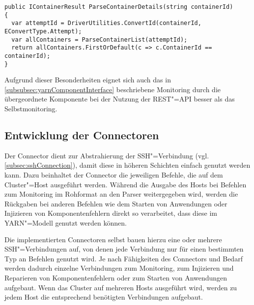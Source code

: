 \begin{lstlisting}[label=lst:restParseDetails,style=cs,
caption={[Konvertierung und Rückgabe der Daten eines einzelnen Containers durch den RestParser]
    Konvertierung und Rückgabe der Daten eines einzelnen Containers durch den \texttt{RestParser}.
    Hierbei muss zunächst die ID des übergeordneten Attempts ermittelt werden, bevor aus der Liste aller Container die Daten des gesuchten Containers zurückgegeben werden können.
    Bei Attempts ist dieses Vorgehen analog.}]
public IContainerResult ParseContainerDetails(string containerId)
{
  var attemptId = DriverUtilities.ConvertId(containerId, EConvertType.Attempt);
  var allContainers = ParseContainerList(attemptId);
  return allContainers.FirstOrDefault(c => c.ContainerId == containerId);
}
\end{lstlisting}

Aufgrund dieser Besonderheiten eignet sich auch das in \cref{subsubsec:yarnComponentInterface} beschriebene Monitoring durch die übergeordnete Komponente bei der Nutzung der REST"=API besser als das Selbstmonitoring.

\subsection{Entwicklung der Connectoren}
\label{subsec:implementedConnectors}

Der Connector dient zur Abstrahierung der SSH"=Verbindung (vgl. \cref{subsec:sshConnection}), damit diese in höheren Schichten einfach genutzt werden kann.
Dazu beinhaltet der Connector die jeweiligen Befehle, die auf dem Cluster"=Host ausgeführt werden.
Während die Ausgabe des Hosts bei Befehlen zum Monitoring im Rohformat an den Parser weitergegeben wird, werden die Rückgaben bei anderen Befehlen wie \zB dem Starten von Anwendungen oder Injizieren von Komponentenfehlern direkt so verarbeitet, dass diese im \ac{YARN}"=Modell genutzt werden können.

Die implementierten Connectoren selbst bauen hierzu eine oder mehrere SSH"=Verbindungen auf, von denen jede Verbindung nur für einen bestimmten Typ an Befehlen genutzt wird.
Je nach Fähigkeiten des Connectors und Bedarf werden dadurch einzelne Verbindungen zum Monitoring, zum Injizieren und Reparieren von Komponentenfehlern oder zum Starten von Anwendungen aufgebaut.
Wenn das Cluster auf mehreren Hosts ausgeführt wird, werden zu jedem Host die entsprechend benötigten Verbindungen aufgebaut.

